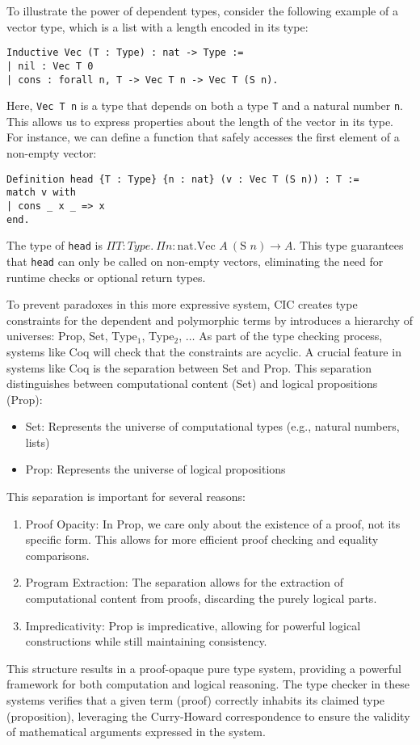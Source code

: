 To illustrate the power of dependent types, consider the following example of a vector type, which is a list with a length encoded in its type:
\begin{verbatim}
Inductive Vec (T : Type) : nat -> Type :=
| nil : Vec T 0
| cons : forall n, T -> Vec T n -> Vec T (S n).
\end{verbatim}
Here, \texttt{Vec T n} is a type that depends on both a type \texttt{T} and a natural number \texttt{n}. 
This allows us to express properties about the length of the vector in its type. 
For instance, we can define a function that safely accesses the first element of a non-empty vector:
\begin{verbatim}
Definition head {T : Type} {n : nat} (v : Vec T (S n)) : T :=
match v with
| cons _ x _ => x
end.
\end{verbatim}
The type of \texttt{head} is $\Pi T:Type.~\Pi n:\text{nat}. \text{Vec } A~(\text{S } n) \to A$. 
This type guarantees that \texttt{head} can only be called on non-empty vectors, eliminating the need for runtime checks or optional return types.

To prevent paradoxes in this more expressive system, CIC creates type constraints for the dependent and polymorphic terms by introduces a hierarchy of universes: Prop, Set, Type$_1$, Type$_2$, $\ldots$
As part of the type checking process, systems like Coq will check that the constraints are acyclic.
A crucial feature in systems like Coq is the separation between Set and Prop. 
This separation distinguishes between computational content (Set) and logical propositions (Prop):
\begin{itemize}
\item Set: Represents the universe of computational types (e.g., natural numbers, lists)
\item Prop: Represents the universe of logical propositions
\end{itemize}
This separation is important for several reasons:
\begin{enumerate}
\item Proof Opacity: In Prop, we care only about the existence of a proof, not its specific form. 
This allows for more efficient proof checking and equality comparisons.
\item Program Extraction: The separation allows for the extraction of computational content from proofs, discarding the purely logical parts.
\item Impredicativity: Prop is impredicative, allowing for powerful logical constructions while still maintaining consistency.
\end{enumerate}
This structure results in a proof-opaque pure type system, providing a powerful framework for both computation and logical reasoning. 
The type checker in these systems verifies that a given term (proof) correctly inhabits its claimed type (proposition), leveraging the Curry-Howard correspondence to ensure the validity of mathematical arguments expressed in the system.

